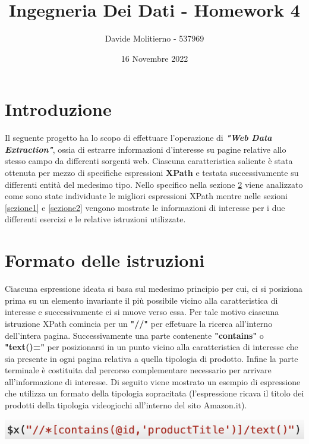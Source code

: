 \documentclass[12pt, letterpaper]{article}
\title{Ingegneria Dei Dati - Homework 4}
\author{Davide Molitierno - 537969}
\date{16 Novembre 2022}
\begin{document}
\maketitle

\section{Introduzione}
Il seguente progetto ha lo scopo di effettuare l'operazione di \emph{\textbf{"Web Data Extraction"}}, ossia di estrarre informazioni d'interesse su pagine relative allo stesso campo da differenti sorgenti web. Ciascuna caratteristica saliente è stata ottenuta per mezzo di specifiche espressioni \textbf{XPath} e testata successivamente su differenti entità del medesimo tipo.
Nello specifico nella sezione \ref{istruzioni} viene analizzato come sono state individuate le migliori espressioni XPath mentre nelle sezioni \ref{sezione1} e \ref{sezione2} vengono mostrate le informazioni di interesse per i due differenti esercizi e le relative istruzioni utilizzate.
\section{Formato delle istruzioni} \label{istruzioni}
Ciascuna espressione ideata si basa sul medesimo principio per cui, ci si posiziona prima su un elemento invariante il più possibile vicino alla caratteristica di interesse e successivamente ci si muove verso essa. Per tale motivo ciascuna istruzione XPath comincia per un \textbf{"//"} per effetuare la ricerca all'interno dell'intera pagina. Successivamente una parte contenente \textbf{"contains"} o \textbf{"text()="} per posizionarsi in un punto vicino alla caratteristica di interesse che sia presente in ogni pagina relativa a quella tipologia di prodotto. Infine la parte terminale è costituita dal percorso complementare necessario per arrivare all'informazione di interesse. Di seguito viene mostrato un esempio di espressione che utilizza un formato della tipologia sopracitata (l'espressione ricava il titolo dei prodotti della tipologia videogiochi all'interno del sito Amazon.it).

\begin{center}
    \includegraphics{Espressione XPath}
\end{center}
\end{document}
